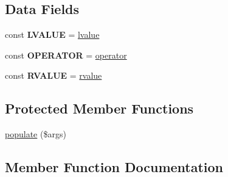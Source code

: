 \subsection*{Data Fields}
\begin{DoxyCompactItemize}
\item 
\hypertarget{class_able_polecat___query_language___expression___binary_abstract_aba5ddf83b689b7b8797fd6413edb870c}{}const {\bfseries L\+V\+A\+L\+U\+E} = \textquotesingle{}\hyperlink{class_able_polecat___query_language___expression___binary_abstract_a3441a080c58bdf934f6f24e8c0aea673}{lvalue}\textquotesingle{}\label{class_able_polecat___query_language___expression___binary_abstract_aba5ddf83b689b7b8797fd6413edb870c}

\item 
\hypertarget{class_able_polecat___query_language___expression___binary_abstract_aa2a7bac5a0b1b007922aea7b84b3064b}{}const {\bfseries O\+P\+E\+R\+A\+T\+O\+R} = \textquotesingle{}\hyperlink{class_able_polecat___query_language___expression___binary_abstract_a27d661679d6ca841f034118ea52159d8}{operator}\textquotesingle{}\label{class_able_polecat___query_language___expression___binary_abstract_aa2a7bac5a0b1b007922aea7b84b3064b}

\item 
\hypertarget{class_able_polecat___query_language___expression___binary_abstract_aadbf2d1d4bcaf072d1e909d444427f06}{}const {\bfseries R\+V\+A\+L\+U\+E} = \textquotesingle{}\hyperlink{class_able_polecat___query_language___expression___binary_abstract_ac9c038619eb9e83d210e7dbd81888824}{rvalue}\textquotesingle{}\label{class_able_polecat___query_language___expression___binary_abstract_aadbf2d1d4bcaf072d1e909d444427f06}

\end{DoxyCompactItemize}
\subsection*{Protected Member Functions}
\begin{DoxyCompactItemize}
\item 
\hyperlink{class_able_polecat___query_language___expression___binary_abstract_a0fd5f9d8f79d955f8daad6721d67a5f4}{populate} (\$args)
\end{DoxyCompactItemize}


\subsection{Member Function Documentation}
\hypertarget{class_able_polecat___query_language___expression___binary_abstract_a3441a080c58bdf934f6f24e8c0aea673}{}
